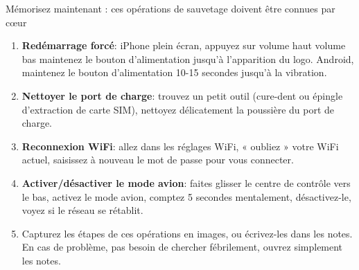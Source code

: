 \begin{tcbpractice}{Mémorisez maintenant : ces opérations de sauvetage doivent être connues par cœur}
\begin{enumerate}
  \item \textbf{Redémarrage forcé}: iPhone plein écran, appuyez sur volume haut volume bas maintenez le bouton d'alimentation jusqu'à l'apparition du logo. Android, maintenez le bouton d'alimentation 10-15 secondes jusqu'à la vibration.
  \item \textbf{Nettoyer le port de charge}: trouvez un petit outil (cure-dent ou épingle d'extraction de carte SIM), nettoyez délicatement la poussière du port de charge.
  \item \textbf{Reconnexion WiFi}: allez dans les réglages WiFi, « oubliez » votre WiFi actuel, saisissez à nouveau le mot de passe pour vous connecter.
  \item \textbf{Activer/désactiver le mode avion}: faites glisser le centre de contrôle vers le bas, activez le mode avion, comptez 5 secondes mentalement, désactivez-le, voyez si le réseau se rétablit.
  \item Capturez les étapes de ces opérations en images, ou écrivez-les dans les notes. En cas de problème, pas besoin de chercher fébrilement, ouvrez simplement les notes.
\end{enumerate}

\end{tcbpractice}
